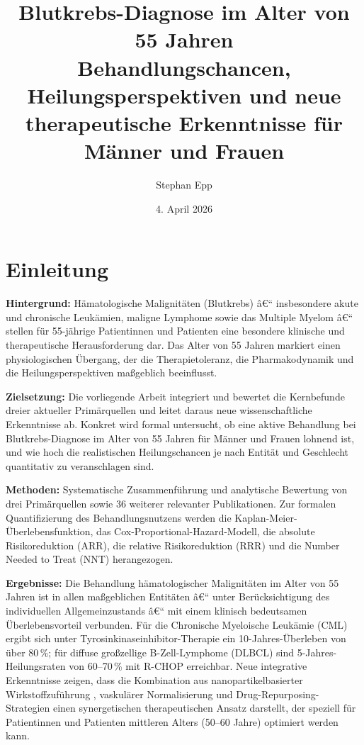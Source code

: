 ﻿\documentclass[12pt,a4paper]{article}
\title{\textbf{Blutkrebs-Diagnose im Alter von 55 Jahren}\\{\Large Behandlungschancen, Heilungsperspektiven und neue therapeutische Erkenntnisse für Männer und Frauen}}
\date{4. April 2026}
\author{Stephan Epp}
\theoremstyle{definition}
\begin{document}
\maketitle
\tableofcontents
\newpage

\section{Einleitung}
\label{sec:einleitung}
\textbf{Hintergrund:} Hämatologische Malignitäten (Blutkrebs) â€“ insbesondere akute und
chronische Leukämien, maligne Lymphome sowie das Multiple Myelom â€“ stellen für
55-jährige Patientinnen und Patienten eine besondere klinische und therapeutische
Herausforderung dar. Das Alter von 55 Jahren markiert einen physiologischen Übergang,
der die Therapietoleranz, die Pharmakodynamik und die Heilungsperspektiven maßgeblich
beeinflusst.

\noindent
\textbf{Zielsetzung:} Die vorliegende Arbeit integriert und bewertet die Kernbefunde
dreier aktueller Primärquellen \cite{adeyemi2025,wong2016,mccabe2015} und leitet daraus
neue wissenschaftliche Erkenntnisse ab. Konkret wird formal untersucht, ob eine aktive
Behandlung bei Blutkrebs-Diagnose im Alter von 55 Jahren für Männer und Frauen lohnend
ist, und wie hoch die realistischen Heilungschancen je nach Entität und Geschlecht
quantitativ zu veranschlagen sind.

\noindent
\textbf{Methoden:} Systematische Zusammenführung und analytische Bewertung von drei
Primärquellen sowie 36 weiterer relevanter Publikationen. Zur formalen Quantifizierung
des Behandlungsnutzens werden die Kaplan-Meier-Überlebensfunktion, das
Cox-Proportional-Hazard-Modell, die absolute Risikoreduktion (ARR), die relative
Risikoreduktion (RRR) und die Number Needed to Treat (NNT) herangezogen.

\noindent
\textbf{Ergebnisse:} Die Behandlung hämatologischer Malignitäten im Alter von 55 Jahren
ist in allen maßgeblichen Entitäten â€“ unter Berücksichtigung des individuellen
Allgemeinzustands â€“ mit einem klinisch bedeutsamen Überlebensvorteil verbunden. Für
die Chronische Myeloische Leukämie (CML) ergibt sich unter Tyrosinkinaseinhibitor-Therapie
ein 10-Jahres-Überleben von über 80\,\%; für diffuse großzellige B-Zell-Lymphome (DLBCL)
sind 5-Jahres-Heilungsraten von 60--70\,\% mit R-CHOP erreichbar. Neue integrative
Erkenntnisse zeigen, dass die Kombination aus nanopartikelbasierter Wirkstoffzuführung
\cite{adeyemi2025}, vaskulärer Normalisierung \cite{wong2016} und Drug-Repurposing-Strategien
\cite{mccabe2015} einen synergetischen therapeutischen Ansatz darstellt, der speziell für
Patientinnen und Patienten mittleren Alters (50--60 Jahre) optimiert werden kann.
\end{document}
